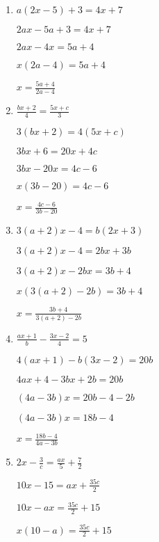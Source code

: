 \documentclass[10pt]{exam}
\begin{document}
\begin{multicols*}{2}
\begin{enumerate}
\item \( \displaystyle a(2x - 5) + 3 = 4x + 7 \)

\( \displaystyle 2ax - 5a + 3 = 4x + 7 \)

\( \displaystyle 2ax - 4x = 5a + 4 \)

\( \displaystyle x(2a - 4) = 5a + 4 \)

\( \displaystyle x = \frac{5a + 4}{2a - 4} \)

\item \( \displaystyle \frac{bx + 2}{4} = \frac{5x + c}{3} \)

\( \displaystyle 3(bx + 2) = 4(5x + c) \)

\( \displaystyle 3bx + 6 = 20x + 4c \)

\( \displaystyle 3bx - 20x = 4c - 6 \)

\( \displaystyle x(3b - 20) = 4c - 6 \)

\( \displaystyle x = \frac{4c - 6}{3b - 20} \)

\item \( \displaystyle 3(a + 2)x - 4 = b(2x + 3) \)

\( \displaystyle 3(a + 2)x - 4 = 2bx + 3b \)

\( \displaystyle 3(a + 2)x - 2bx = 3b + 4 \)

\( \displaystyle x(3(a + 2) - 2b) = 3b + 4 \)

\( \displaystyle x = \frac{3b + 4}{3(a + 2) - 2b} \)

\item \( \displaystyle \frac{ax + 1}{b} - \frac{3x - 2}{4} = 5 \)

\( \displaystyle 4(ax + 1) - b(3x - 2) = 20b \)

\( \displaystyle 4ax + 4 - 3bx + 2b = 20b \)

\( \displaystyle (4a - 3b)x = 20b - 4 - 2b \)

\( \displaystyle (4a - 3b)x = 18b - 4 \)

\( \displaystyle x = \frac{18b - 4}{4a - 3b} \)

\item \( \displaystyle 2x - \frac{3}{c} = \frac{ax}{5} + \frac{7}{2} \)

\( \displaystyle 10x - 15 = ax + \frac{35c}{2} \)

\( \displaystyle 10x - ax = \frac{35c}{2} + 15 \)

\( \displaystyle x(10 - a) = \frac{35c}{2} + 15 \)


\end{enumerate}
\end{multicols*}
\end{document}
